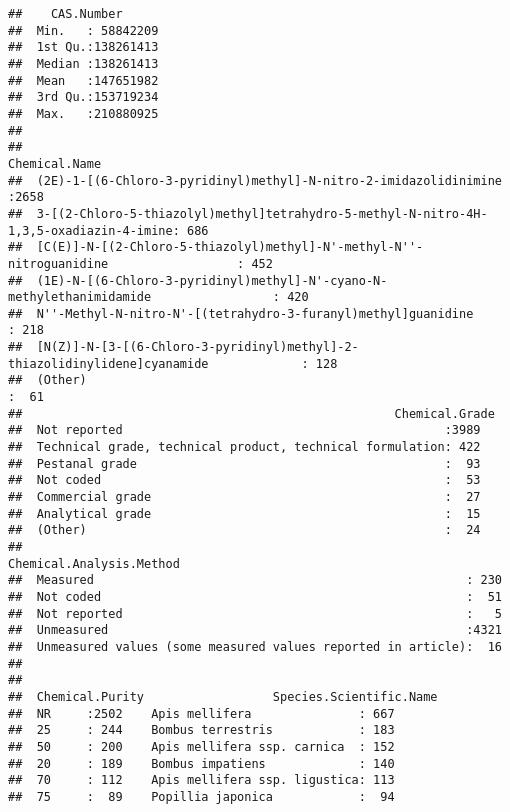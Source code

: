\documentclass[
  12pt,
]{article}
\begin{document}
\begin{verbatim}
##    CAS.Number       
##  Min.   : 58842209  
##  1st Qu.:138261413  
##  Median :138261413  
##  Mean   :147651982  
##  3rd Qu.:153719234  
##  Max.   :210880925  
##                     
##                                                                                 Chemical.Name 
##  (2E)-1-[(6-Chloro-3-pyridinyl)methyl]-N-nitro-2-imidazolidinimine                     :2658  
##  3-[(2-Chloro-5-thiazolyl)methyl]tetrahydro-5-methyl-N-nitro-4H-1,3,5-oxadiazin-4-imine: 686  
##  [C(E)]-N-[(2-Chloro-5-thiazolyl)methyl]-N'-methyl-N''-nitroguanidine                  : 452  
##  (1E)-N-[(6-Chloro-3-pyridinyl)methyl]-N'-cyano-N-methylethanimidamide                 : 420  
##  N''-Methyl-N-nitro-N'-[(tetrahydro-3-furanyl)methyl]guanidine                         : 218  
##  [N(Z)]-N-[3-[(6-Chloro-3-pyridinyl)methyl]-2-thiazolidinylidene]cyanamide             : 128  
##  (Other)                                                                               :  61  
##                                                    Chemical.Grade
##  Not reported                                             :3989  
##  Technical grade, technical product, technical formulation: 422  
##  Pestanal grade                                           :  93  
##  Not coded                                                :  53  
##  Commercial grade                                         :  27  
##  Analytical grade                                         :  15  
##  (Other)                                                  :  24  
##                                                  Chemical.Analysis.Method
##  Measured                                                    : 230       
##  Not coded                                                   :  51       
##  Not reported                                                :   5       
##  Unmeasured                                                  :4321       
##  Unmeasured values (some measured values reported in article):  16       
##                                                                          
##                                                                          
##  Chemical.Purity                  Species.Scientific.Name
##  NR     :2502    Apis mellifera               : 667      
##  25     : 244    Bombus terrestris            : 183      
##  50     : 200    Apis mellifera ssp. carnica  : 152      
##  20     : 189    Bombus impatiens             : 140      
##  70     : 112    Apis mellifera ssp. ligustica: 113      
##  75     :  89    Popillia japonica            :  94      

\end{verbatim}
\end{document}
